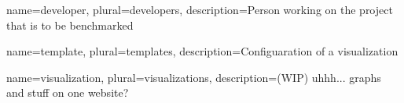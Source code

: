 \makenoidxglossaries

{
	name=developer,
	plural=developers,
	description={Person working on the project that is to be benchmarked}
}

{
	name=template,
	plural=templates,
	description={Configuaration of a \gls{visualization}}
}

{
	name=visualization,
	plural=visualizations,
	description={(WIP) uhhh... graphs and stuff on one website?}
}


